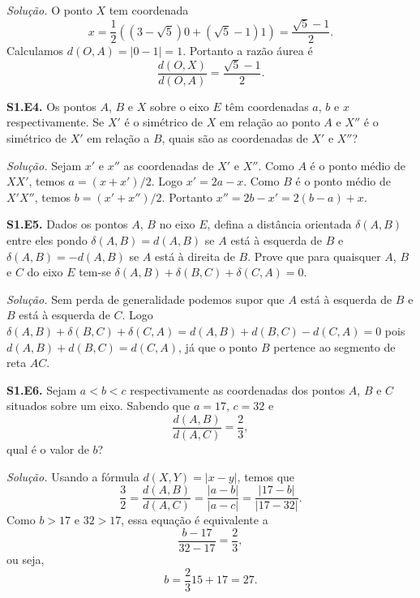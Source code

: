 \documentclass[a4paper,11pt]{article}
\begin{document}
\vspace{\baselineskip}

\emph{Solução.}
O ponto $X$ tem coordenada
\[
  x = \frac{1}{2} ( (3-\sqrt{5}) 0 + (\sqrt{5}-1) 1 ) = \frac{\sqrt{5}-1}{2}.
\]
Calculamos $d(O,A) = |0-1| = 1$.
Portanto a razão áurea é
\[
  \frac{d(O,X)}{d(O,A)} = \frac{\sqrt{5}-1}{2}.
\]

\vspace{\baselineskip}

\textbf{S1.E4.}
Os pontos $A$, $B$ e $X$ sobre o eixo $E$ têm coordenadas $a$, $b$ e $x$ respectivamente.
Se $X'$ é o simétrico de $X$ em relação ao ponto $A$ e $X''$ é o simétrico de $X'$ em relação a $B$, quais são as coordenadas de $X'$ e $X''$?

\vspace{\baselineskip}

\emph{Solução.}
Sejam $x'$ e $x''$ as coordenadas de $X'$ e $X''$.
Como $A$ é o ponto médio de $XX'$, temos $a = (x+x')/2$.
Logo $x' = 2a - x$.
Como $B$ é o ponto médio de $X'X''$, temos $b = (x'+x'')/2$.
Portanto $x'' = 2b - x' = 2(b-a) + x$.

\vspace{\baselineskip}

\textbf{S1.E5.}
Dados os pontos $A$, $B$ no eixo $E$, defina a distância orientada $\delta(A,B)$ entre eles pondo $\delta(A,B) = d(A,B)$ se $A$ está à esquerda de $B$ e $\delta(A,B) = -d(A,B)$ se $A$ está à direita de $B$.
Prove que para quaisquer $A$, $B$ e $C$ do eixo $E$ tem-se $\delta(A,B) + \delta(B,C) + \delta (C,A) = 0$.

\vspace{\baselineskip}

\emph{Solução.}
Sem perda de generalidade podemos supor que $A$ está à esquerda de $B$ e $B$ está à esquerda de $C$.
Logo $\delta(A,B) + \delta(B,C) + \delta (C,A) = d(A,B) + d(B,C) - d(C,A) = 0$ pois $d(A,B) + d(B,C) = d(C,A)$, já que o ponto $B$ pertence ao segmento de reta $AC$.

\vspace{\baselineskip}

\textbf{S1.E6.}
Sejam $a < b < c$ respectivamente as coordenadas dos pontos $A$, $B$ e $C$ situados sobre um eixo.
Sabendo que $a = 17$, $c = 32$ e
\[
  \frac{d(A,B)}{d(A,C)} = \frac{2}{3},
\]
qual é o valor de $b$?

\vspace{\baselineskip}

\emph{Solução.}
Usando a fórmula $d(X,Y) = |x-y|$, temos que
\[
  \frac{3}{2} = \frac{d(A,B)}{d(A,C)} = \frac{|a-b|}{|a-c|} = \frac{|17-b|}{|17-32|}.
\]
Como $b > 17$ e $32 > 17$, essa equação é equivalente a
\[
  \frac{b-17}{32-17} = \frac{2}{3},
\]
ou seja,
\[
  b = \frac{2}{3} 15 + 17 = 27.
\]
\end{document}
